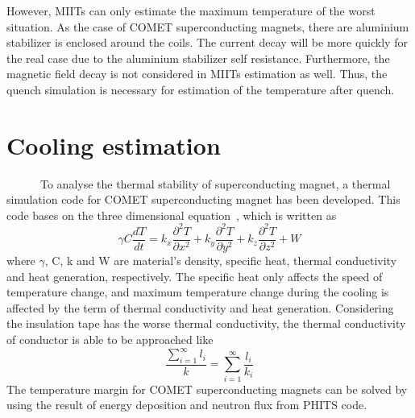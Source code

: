 However, MIITs can only estimate the maximum temperature of the worst situation.
As the case of COMET superconducting magnets, there are aluminium stabilizer is enclosed around the coils.
The current decay will be more quickly for the real case due to the aluminium stabilizer self resistance.
Furthermore, the magnetic field decay is not considered in MIITs estimation as well.
Thus, the quench simulation is necessary for estimation of the temperature after quench.


 \section{Cooling estimation}
~~~~~~To analyse the thermal stability of superconducting magnet, a thermal simulation code for COMET superconducting magnet has been developed.
This code bases on the three dimensional equation~\cite{heat}, which is written as
\begin{equation}
 \gamma C \frac{dT}{dt} = k_x \frac{\partial^2 T}{\partial x^2} + k_y \frac{\partial^2 T}{\partial y^2} + k_z \frac{\partial^2 T}{\partial z^2} + W
\end{equation}
where $\gamma$, C, k and W are material's density, specific heat, thermal conductivity and heat generation, respectively.
The specific heat only affects the speed of temperature change, and maximum temperature change during the cooling is affected by the term of thermal conductivity and heat generation.
Considering the insulation tape has the worse thermal conductivity, the thermal conductivity of conductor is able to be approached like
\begin{equation}
 \frac{\sum^{\infty}_{i=1}l_i}{k} = \sum^{\infty}_{i=1} \frac{l_i}{k_i}
\end{equation}
The temperature margin for COMET superconducting magnets can be solved by using the result of energy deposition and neutron flux from PHITS code.

